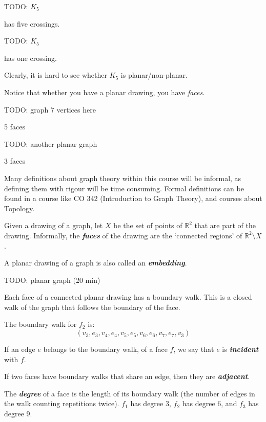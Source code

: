 TODO: $ K_5 $

has five crossings.

TODO: $ K_5 $

has one crossing.

Clearly, it is hard to see whether $ K_5 $ is planar/non-planar.

Notice that whether you have a planar drawing, you have \emph{faces}.

TODO: graph 7 vertices here

5 faces

TODO: another planar graph

3 faces

\begin{remark}
    Many definitions about graph theory within this course will be informal,
    as defining them with rigour will be time consuming. Formal definitions
    can be found in a course like CO 342 (Introduction to Graph Theory),
    and courses about Topology.
\end{remark}

\begin{defbox}
    \begin{definition}
        Given a drawing of a graph,
        let $ X $ be the set of points of $ \mathbb{R}^2 $ that
        are part of the drawing. Informally, the \textbf{\emph{faces}}
        of the drawing are the `connected regions'
        of $ \mathbb{R}^2\setminus X $.
    \end{definition}
\end{defbox}

\begin{remark}
    A planar drawing of a graph is also called an \textbf{\emph{embedding}}.
\end{remark}

TODO: planar graph (20 min)

Each face of a connected planar drawing has a boundary walk. This is a
closed walk of the graph that follows the boundary of the
face.

The boundary walk for $ f_2 $ is:
\[ (v_3,e_3,v_4,e_4,v_5,e_5,v_6,e_6,v_7,e_7,v_3) \]

If an edge $ e $ belongs to the boundary walk, of a face $ f $,
we say that $ e $ is \textbf{\emph{incident}} with $ f $.

If two faces have boundary walks that share an edge,
then they are \textbf{\emph{adjacent}}.

The \textbf{\emph{degree}} of a face is the length of its
boundary walk (the number of edges in the walk counting repetitions
twice). $ f_1 $ has degree $ 3 $,
$ f_2 $ has degree $ 6 $, and $ f_3 $ has degree $ 9 $.

